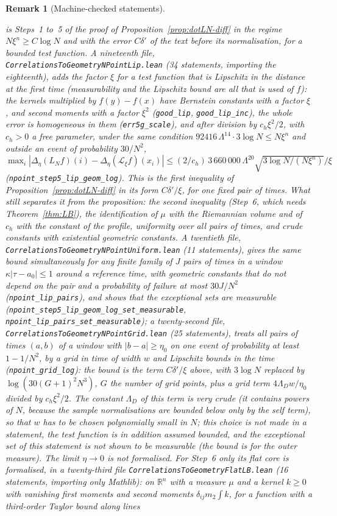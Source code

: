 \documentclass[11pt,a4paper]{article}
\theoremstyle{stmt}
\theoremstyle{defn}
\theoremstyle{rmk}
\newtheorem{remark}[theorem]{Remark}
\numberwithin{equation}{section}
\newcommand{\R}{\mathbb{R}}
\begin{document}
{\begin{remark}[Machine-checked statements]
\begin{itemize}
is Steps~1 to~5 of the proof of Proposition~\ref{prop:dotLN-diff} in the regime $N\xi^n\ge C\log N$ and with the error $C\delta'$ of the text before its normalisation, for a bounded test function. A nineteenth file, \texttt{CorrelationsToGeometryNPointLip.lean} (34 statements, importing the eighteenth), adds the factor $\xi$ for a test function that is Lipschitz in the distance at the first time (measurability and the Lipschitz bound are all that is used of $f$): the kernels multiplied by $f(y)-f(x)$ have Bernstein constants with a factor $\xi$, and second moments with a factor $\xi^2$ (\texttt{good\_lip}, \texttt{good\_lip\_inc}), the whole error is homogeneous in them (\texttt{err5g\_scale}), and after division by $c_h\xi^2/2$, with $c_h>0$ a free parameter, under the same condition $92416\,\Lambda^{14}\cdot3\log N\le N\xi^n$ and outside an event of probability $30/N^2$, $\max_i|\Delta_\eta(L_Nf)(i)-\Delta_\eta(\mathcal L_\xi f)(x_i)|\le(2/c_h)\,3\,660\,000\,\Lambda^{20}\sqrt{3\log N/(N\xi^n)}/\xi$ (\texttt{npoint\_step5\_lip\_geom\_log}). This is the first inequality of Proposition~\ref{prop:dotLN-diff} in its form $C\delta'/\xi$, for one fixed pair of times. What still separates it from the proposition: the second inequality (Step~6, which needs Theorem~\ref{thm:LB}), the identification of $\mu$ with the Riemannian volume and of $c_h$ with the constant of the profile, uniformity over all pairs of times, and crude constants with existential geometric constants. A twentieth file, \texttt{CorrelationsToGeometryNPointUniform.lean} (11 statements), gives the same bound simultaneously for any finite family of $J$ pairs of times in a window $\kappa|\tau-a_0|\le1$ around a reference time, with geometric constants that do not depend on the pair and a probability of failure at most $30J/N^2$ (\texttt{npoint\_lip\_pairs}), and shows that the exceptional sets are measurable (\texttt{npoint\_step5\_lip\_geom\_log\_set\_measurable}, \texttt{npoint\_lip\_pairs\_set\_measurable}); a twenty-second file, \texttt{CorrelationsToGeometryNPointGrid.lean} (25 statements), treats all pairs of times $(a,b)$ of a window with $|b-a|\ge\eta_0$ on one event of probability at least $1-1/N^2$, by a grid in time of width $w$ and Lipschitz bounds in the time (\texttt{npoint\_grid\_log}): the bound is the term $C\delta'/\xi$ above, with $3\log N$ replaced by $\log(30(G+1)^2N^3)$, $G$ the number of grid points, plus a grid term $4\Lambda_Dw/\eta_0$ divided by $c_h\xi^2/2$. The constant $\Lambda_D$ of this term is very crude (it contains powers of $N$, because the sample normalisations are bounded below only by the self term), so that $w$ has to be chosen polynomially small in $N$; this choice is not made in a statement, the test function is in addition assumed bounded, and the exceptional set of this statement is not shown to be measurable (the bound is for the outer measure). The limit $\eta\to0$ is not formalised. For Step~6 only its flat core is formalised, in a twenty-third file \texttt{CorrelationsToGeometryFlatLB.lean} (16 statements, importing only Mathlib): on $\R^n$ with a measure $\mu$ and a kernel $k\ge0$ with vanishing first moments and second moments $\delta_{ij}m_2\int k$, for a function with a third-order Taylor bound along lines 
\end{itemize}
\end{remark}}
\end{document}
